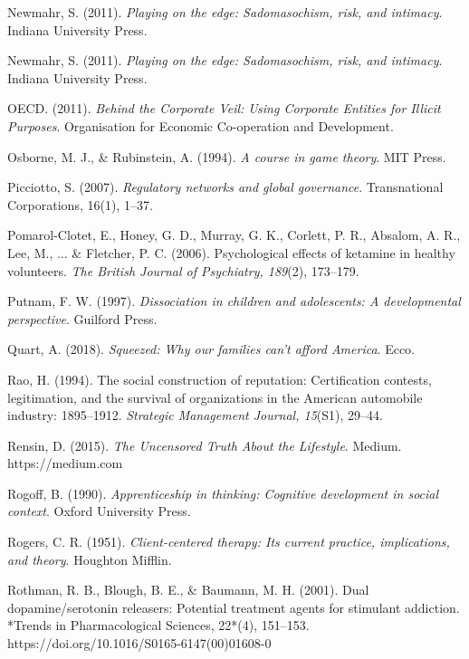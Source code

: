 \begin{thebibliography}{}
    Newmahr, S. (2011). \textit{Playing on the edge: Sadomasochism, risk, and intimacy}. Indiana University Press.

    Newmahr, S. (2011). \textit{Playing on the edge: Sadomasochism, risk, and intimacy}. Indiana University Press.

    OECD. (2011). \textit{Behind the Corporate Veil: Using Corporate Entities for Illicit Purposes}. Organisation for Economic Co-operation and Development.

    Osborne, M. J., \& Rubinstein, A. (1994). \textit{A course in game theory}. MIT Press.

    Picciotto, S. (2007). \textit{Regulatory networks and global governance}. Transnational Corporations, 16(1), 1–37.

    Pomarol-Clotet, E., Honey, G. D., Murray, G. K., Corlett, P. R., Absalom, A. R., Lee, M., ... \& Fletcher, P. C. (2006). Psychological effects of ketamine in healthy volunteers. \textit{The British Journal of Psychiatry, 189}(2), 173–179.

    Putnam, F. W. (1997). \textit{Dissociation in children and adolescents: A developmental perspective}. Guilford Press.

    Quart, A. (2018). \textit{Squeezed: Why our families can't afford America}. Ecco.

    Rao, H. (1994). The social construction of reputation: Certification contests, legitimation, and the survival of organizations in the American automobile industry: 1895–1912. \textit{Strategic Management Journal, 15}(S1), 29–44.

    Rensin, D. (2015). \textit{The Uncensored Truth About the Lifestyle}. Medium. https://medium.com
    
    Rogoff, B. (1990). \textit{Apprenticeship in thinking: Cognitive development in social context}. Oxford University Press.

    Rogers, C. R. (1951). \textit{Client-centered therapy: Its current practice, implications, and theory}. Houghton Mifflin.

    Rothman, R. B., Blough, B. E., \& Baumann, M. H. (2001). Dual dopamine/serotonin releasers: Potential treatment agents for stimulant addiction. *Trends in Pharmacological Sciences, 22*(4), 151–153. https://doi.org/10.1016/S0165-6147(00)01608-0


\end{thebibliography}
